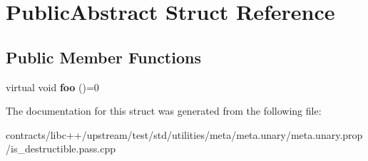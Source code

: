 \hypertarget{struct_public_abstract}{}\section{Public\+Abstract Struct Reference}
\label{struct_public_abstract}
\subsection*{Public Member Functions}
\begin{DoxyCompactItemize}
\item 
\mbox{\label{struct_public_abstract_ab6167afb43576298db35ea9a1ee4244c}} 
virtual void {\bfseries foo} ()=0
\end{DoxyCompactItemize}


The documentation for this struct was generated from the following file\+:\begin{DoxyCompactItemize}
\item 
contracts/libc++/upstream/test/std/utilities/meta/meta.\+unary/meta.\+unary.\+prop/is\+\_\+destructible.\+pass.\+cpp\end{DoxyCompactItemize}
